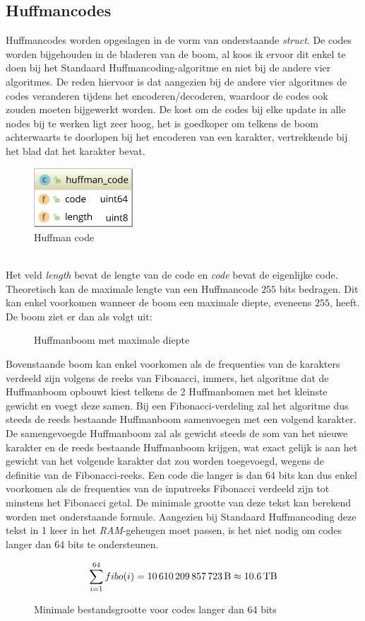 \subsection{Huffmancodes}
Huffmancodes worden opgeslagen in de vorm van onderstaande \emph{struct}. De codes worden bijgehouden in de bladeren van de boom, al koos ik ervoor dit enkel te doen bij het Standaard Huffmancoding-algoritme en niet bij de andere vier algoritmes. De reden hiervoor is dat aangezien bij de andere vier algoritmes de codes veranderen tijdens het encoderen/decoderen, waardoor de codes ook zouden moeten bijgewerkt worden. De kost om de codes bij elke update in alle nodes bij te werken ligt zeer hoog, het is goedkoper om telkens de boom achterwaarts te doorlopen bij het encoderen van een karakter, vertrekkende bij het blad dat het karakter bevat.
\begin{figure}[h]
	\centering
	\includegraphics[width=10em]{resources/huffman-code.png}
	\caption{Huffman code}
\end{figure}
\\Het veld \emph{length} bevat de lengte van de code en \emph{code} bevat de eigenlijke code. Theoretisch kan de maximale lengte van een Huffmancode $255$ bits bedragen. Dit kan enkel voorkomen wanneer de boom een maximale diepte, eveneens $255$, heeft. De boom ziet er dan als volgt uit:
\newpage
\begin{figure}[h]
	\centering
	
	\caption{Huffmanboom met maximale diepte}
\end{figure}
\noindent Bovenstaande boom kan enkel voorkomen als de frequenties van de karakters verdeeld zijn volgens de reeks van Fibonacci, immers, het algoritme dat de Huffmanboom opbouwt kiest telkens de 2 Huffmanbomen met het kleinste gewicht en voegt deze samen. Bij een Fibonacci-verdeling zal het algoritme dus steeds de reeds bestaande Huffmanboom samenvoegen met een volgend karakter. De samengevoegde Huffmanboom zal als gewicht steeds de som van het nieuwe karakter en de reeds bestaande Huffmanboom krijgen, wat exact gelijk is aan het gewicht van het volgende karakter dat zou worden toegevoegd, wegens de definitie van de Fibonacci-reeks. Een code die langer is dan 64 bits kan dus enkel voorkomen als de frequenties van de inputreeks Fibonacci verdeeld zijn tot minstens het  Fibonacci getal. De minimale grootte van deze tekst kan berekend worden met onderstaande formule. Aangezien bij Standaard Huffmancoding deze tekst in 1 keer in het \emph{RAM}-geheugen moet passen, is het niet nodig om codes langer dan 64 bits te ondersteunen.
\begin{figure}[h]
	$$\sum_{i=1}^{64} fibo(i) = \text{\SI{10610209857723}{\byte}} \approx \SI{10.6}{\tera\byte}$$
	\caption{Minimale bestandsgrootte voor codes langer dan 64 bits}
\end{figure}